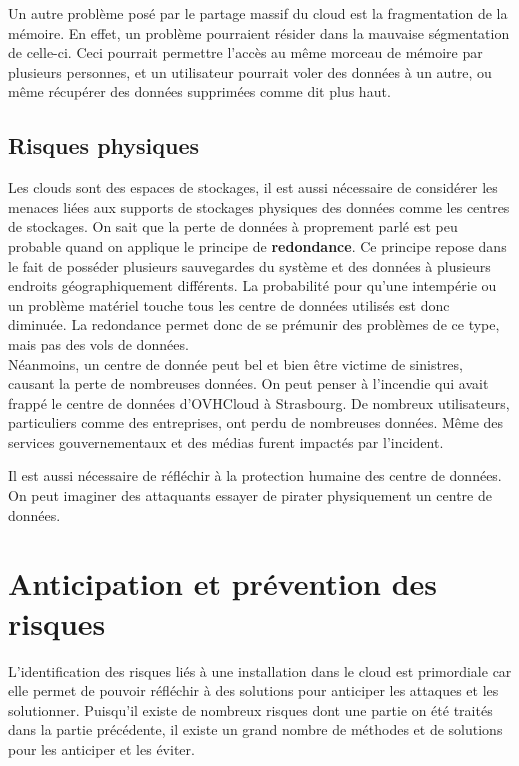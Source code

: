 \documentclass[a4paper, 12pt]{article}
\begin{document}
\begin{spacing}{1.1}
      Un autre problème posé par le partage massif du cloud est la fragmentation
      de la mémoire. En effet, un problème pourraient résider dans la mauvaise
      ségmentation de celle-ci. Ceci pourrait permettre l'accès au même
      morceau de mémoire par plusieurs personnes, et un utilisateur pourrait
      voler des données à un autre, ou même récupérer des données supprimées
      comme dit plus haut.

    \subsection{Risques physiques}
      Les clouds sont des espaces de stockages, il est aussi nécessaire de
      considérer les menaces liées aux supports de stockages physiques des
      données comme les centres de stockages. On sait que la perte de données
      à proprement parlé est peu probable quand on applique le principe de
      \textbf{redondance}. Ce principe repose dans le fait de posséder plusieurs
      sauvegardes du système et des données à plusieurs endroits
      géographiquement différents. La probabilité pour qu'une intempérie ou un
      problème matériel touche tous les centre de données utilisés est donc
      diminuée. La redondance permet donc de se prémunir des problèmes de ce
      type, mais pas des vols de données. \\

      Néanmoins, un centre de donnée peut bel et bien être victime de sinistres,
      causant la perte de nombreuses données. On peut penser à l'incendie qui
      avait frappé le centre de données d'OVHCloud à Strasbourg. De nombreux
      utilisateurs, particuliers comme des entreprises, ont perdu de nombreuses
      données. Même des services gouvernementaux et des médias furent impactés
      par l'incident.

      Il est aussi nécessaire de réfléchir à la protection humaine des centre de
      données. On peut imaginer des attaquants essayer de pirater physiquement
      un centre de données.

  \section{Anticipation et prévention des risques}
      L'identification des risques liés à une installation dans le cloud est
      primordiale car elle permet de pouvoir réfléchir à des solutions pour
      anticiper les attaques et les solutionner. Puisqu'il existe de nombreux
      risques dont une partie on été traités dans la partie précédente, il
      existe un grand nombre de méthodes et de solutions pour les anticiper
      et les éviter.


\end{spacing}
\end{document}
